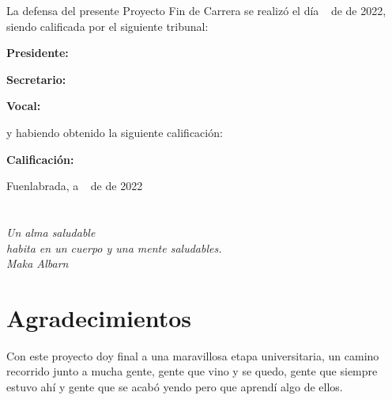 \documentclass[a4paper, 12pt]{book}
\begin{document}
\vspace{1cm}
La defensa del presente Proyecto Fin de Carrera se realizó el día \qquad$\;\,$ de \qquad\qquad\qquad\qquad \newline de 2022, siendo calificada por el siguiente tribunal:


\vspace{0.5cm}
\textbf{Presidente:}

\vspace{1.2cm}
\textbf{Secretario:}

\vspace{1.2cm}
\textbf{Vocal:}


\vspace{1.2cm}
y habiendo obtenido la siguiente calificación:

\vspace{1cm}
\textbf{Calificación:}


\vspace{1cm}
\begin{flushright}
Fuenlabrada, a \qquad$\;\,$ de \qquad\qquad\qquad\qquad de 2022
\end{flushright}


\chapter*{}
\begin{flushright}
\textit{Un alma saludable\\ habita en un cuerpo y una mente saludables.\\
Maka Albarn}
\end{flushright}


\chapter*{Agradecimientos}

Con este proyecto doy final a una maravillosa etapa universitaria, un camino recorrido junto a mucha gente, gente que vino y se quedo, gente que siempre estuvo ahí y gente que se acabó yendo pero que aprendí algo de ellos.
\end{document}
